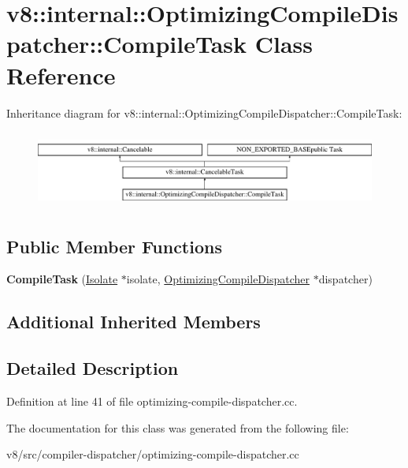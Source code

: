 \hypertarget{classv8_1_1internal_1_1OptimizingCompileDispatcher_1_1CompileTask}{}\section{v8\+:\+:internal\+:\+:Optimizing\+Compile\+Dispatcher\+:\+:Compile\+Task Class Reference}
\label{classv8_1_1internal_1_1OptimizingCompileDispatcher_1_1CompileTask}
Inheritance diagram for v8\+:\+:internal\+:\+:Optimizing\+Compile\+Dispatcher\+:\+:Compile\+Task\+:\begin{figure}[H]
\begin{center}
\leavevmode
\includegraphics[height=2.553191cm]{classv8_1_1internal_1_1OptimizingCompileDispatcher_1_1CompileTask}
\end{center}
\end{figure}
\subsection*{Public Member Functions}
\begin{DoxyCompactItemize}
\item 
\mbox{\label{classv8_1_1internal_1_1OptimizingCompileDispatcher_1_1CompileTask_a98739c2882604956178fa2abe60d99ac}} 
{\bfseries Compile\+Task} (\mbox{\hyperlink{classv8_1_1internal_1_1Isolate}{Isolate}} $\ast$isolate, \mbox{\hyperlink{classv8_1_1internal_1_1OptimizingCompileDispatcher}{Optimizing\+Compile\+Dispatcher}} $\ast$dispatcher)
\end{DoxyCompactItemize}
\subsection*{Additional Inherited Members}


\subsection{Detailed Description}


Definition at line 41 of file optimizing-\/compile-\/dispatcher.\+cc.



The documentation for this class was generated from the following file\+:\begin{DoxyCompactItemize}
\item 
v8/src/compiler-\/dispatcher/optimizing-\/compile-\/dispatcher.\+cc\end{DoxyCompactItemize}
